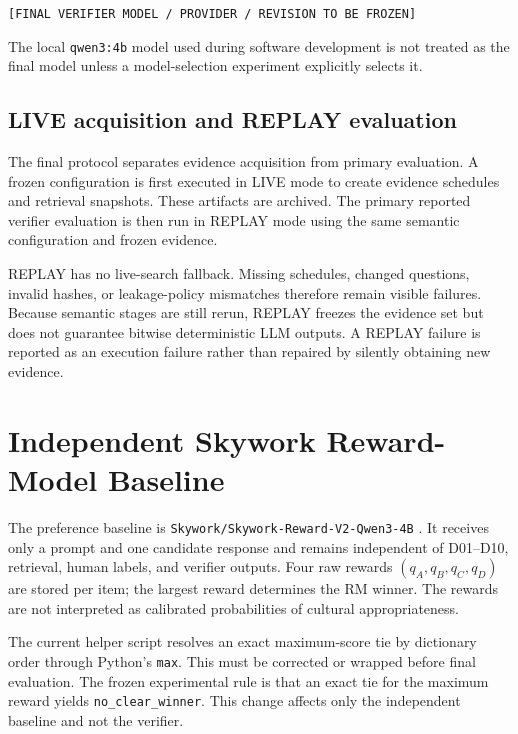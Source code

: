 \begin{center}
\texttt{[FINAL VERIFIER MODEL / PROVIDER / REVISION TO BE FROZEN]}
\end{center}

The local \texttt{qwen3:4b} model used during software development is not treated as the final model unless a model-selection experiment explicitly selects it.

\subsection{LIVE acquisition and REPLAY evaluation}

The final protocol separates evidence acquisition from primary evaluation. A frozen configuration is first executed in LIVE mode to create evidence schedules and retrieval snapshots. These artifacts are archived. The primary reported verifier evaluation is then run in REPLAY mode using the same semantic configuration and frozen evidence.

REPLAY has no live-search fallback. Missing schedules, changed questions, invalid hashes, or leakage-policy mismatches therefore remain visible failures. Because semantic stages are still rerun, REPLAY freezes the evidence set but does not guarantee bitwise deterministic LLM outputs. A REPLAY failure is reported as an execution failure rather than repaired by silently obtaining new evidence.

\section{Independent Skywork Reward-Model Baseline}

The preference baseline is \texttt{Skywork/Skywork-Reward-V2-Qwen3-4B} \parencite{liu2026skyworkrewardv2}. It receives only a prompt and one candidate response and remains independent of D01--D10, retrieval, human labels, and verifier outputs. Four raw rewards $(q_A,q_B,q_C,q_D)$ are stored per item; the largest reward determines the RM winner. The rewards are not interpreted as calibrated probabilities of cultural appropriateness.

The current helper script resolves an exact maximum-score tie by dictionary order through Python's \texttt{max}. This must be corrected or wrapped before final evaluation. The frozen experimental rule is that an exact tie for the maximum reward yields \texttt{no\_clear\_winner}. This change affects only the independent baseline and not the verifier.


